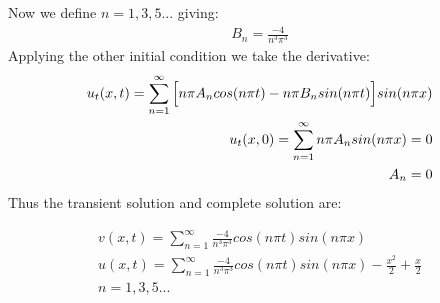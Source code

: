 \documentclass{article}
\begin{document}
Now we define $n = 1,3,5...$ giving:
\begin{equation}
\begin{aligned}
B_n = \frac{-4}{n^3\pi^3}
\end{aligned}
\end{equation}
Applying the other initial condition we take the derivative:
\begin{equation}
\begin{aligned}
u_t(x,t) = \sum_{n=1}^{\infty} \Big{[}n\pi  A_ncos(n\pi t) - n\pi B_nsin(n\pi t) \Big{]}sin(n\pi x)\\
u_t(x,0) = \sum_{n=1}^{\infty}n\pi A_n sin(n\pi x) = 0\\
A_n = 0
\end{aligned}
\end{equation}
Thus the transient solution and complete solution are:
\begin{tcolorbox}[minipage,colback=white,arc=0pt,outer arc=0pt]
\begin{equation}
\begin{aligned}
v(x,t) = \sum_{n=1}^{\infty}\frac{-4}{n^3\pi^3}cos(n\pi t)sin(n\pi x)\\
u(x,t) = \sum_{n=1}^{\infty}\frac{-4}{n^3\pi^3}cos(n\pi t)sin(n\pi x) - \frac{x^2}{2} + \frac{x}{2}\\
n = 1,3,5...
\end{aligned}
\end{equation}
\end{tcolorbox}
\end{document}
